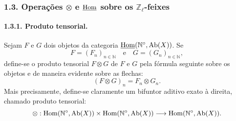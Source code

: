 \subsubsection*{1.3. Operações \(\otimes\) e \(\underline{\operatorname{Hom}}\) sobre os \(\mathbb Z_\ell\)-feixes}

\paragraph{1.3.1. Produto tensorial.}
Sejam \(F\) e \(G\) dois objetos da categoria \(\underline{\operatorname{Hom}}(\mathbb N^\circ,\operatorname{Ab}(X))\). Se
\[
F=(F_n)_{n\in\mathbb N}\quad\text{e}\quad G=(G_n)_{n\in\mathbb N},
\]
define-se o produto tensorial \(F\otimes G\) de \(F\) e \(G\) pela fórmula seguinte sobre os objetos e de maneira evidente sobre as flechas:
\[
(F\otimes G)_n=F_n\otimes G_n.
\]
Mais precisamente, define-se claramente um bifuntor aditivo exato à direita, chamado produto tensorial:
\[
\otimes:\operatorname{Hom}(\mathbb N^\circ,\operatorname{Ab}(X))\times \operatorname{Hom}(\mathbb N^\circ,\operatorname{Ab}(X))
\longrightarrow \operatorname{Hom}(\mathbb N^\circ,\operatorname{Ab}(X)).
\]
